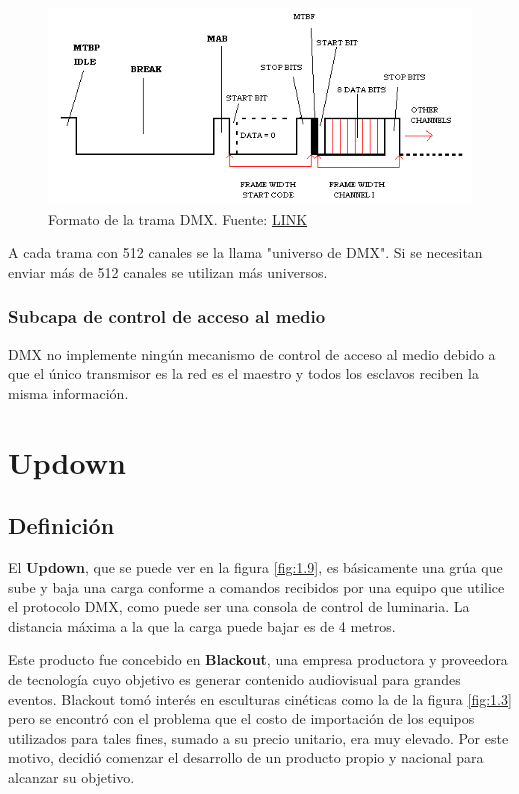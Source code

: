 \begin{figure}[!ht]
	\centering
	\includegraphics[width=15cm,scale=1]{resources/1_8-tramaDMX.png}
	\caption{Formato de la trama DMX. Fuente: \href{http://www.dmx512-online.com/packt.html}{LINK}}
	\label{fig:\thefigure}
\end{figure}

A cada trama con 512 canales se la llama "universo de DMX". Si se necesitan enviar más de 512 canales se utilizan más universos.

\subsubsection{Subcapa de control de acceso al medio}
DMX no implemente ningún mecanismo de control de acceso al medio debido a que el único transmisor es la red es el maestro y todos los esclavos reciben la misma información.

\section{Updown} \label{sec:\thesection}
\subsection{Definición}
El \textbf{Updown}, que se puede ver en la figura \ref{fig:1.9}, es básicamente una grúa que sube y baja una carga conforme a comandos recibidos por una equipo que utilice el protocolo DMX, como puede ser una consola de control de luminaria. La distancia máxima a la que la carga puede bajar es de 4 metros.

Este producto fue concebido en \textbf{Blackout}, una empresa productora y proveedora de tecnología cuyo objetivo es generar contenido audiovisual para grandes eventos. Blackout tomó interés en esculturas cinéticas como la de la figura \ref{fig:1.3} pero se encontró con el problema que el costo de importación de los equipos utilizados para tales fines, sumado a su precio unitario, era muy elevado. Por este motivo, decidió comenzar el desarrollo de un producto propio y nacional para alcanzar su objetivo.\\

